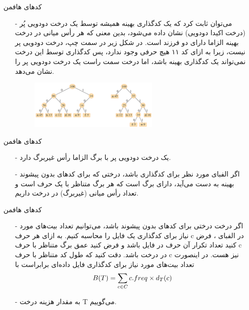 \begin{frame}{‌کدهای هافمن}
\begin{itemize}\itemr
\item[-]
می‌توان ثابت کرد که یک کدگذاری بهینه همیشه توسط یک درخت دودویی پُر
(درخت اکیدا دودویی)
نشان داده می‌شود،
بدین معنی که هر رأس میانی در درخت بهینه الزاما دارای دو فرزند است. در شکل زیر در سمت چپ، درخت دودویی پر نیست، زیرا به ازای کد ۱۱ هیچ حرفی وجود ندارد،
پس کدگذاری توسط این درخت نمی‌تواند یک کدگذاری بهینه باشد،
 اما درخت سمت راست یک درخت دودویی پر را نشان می‌دهد.
\begin{figure}
\includegraphics[width=0.6\textwidth]{figs/chap05/huffman-tree}
\end{figure}
\end{itemize}
\end{frame}


\begin{frame}{‌کدهای هافمن}
\begin{itemize}\itemr
\item[-]
یک درخت دودویی پر با 
 برگ الزاما 
رأس غیربرگ دارد.
\item[-]
اگر
الفبای مورد نظر برای کدگذاری باشد، درختی که برای کدهای بدون پیشوند بهینه به دست می‌آید، دارای
برگ است که هر برگ متناظر با یک حرف است و تعداد
رأس میانی (غیربرگ) در درخت داریم.
\end{itemize}
\end{frame}


\begin{frame}{‌کدهای هافمن}
\begin{itemize}\itemr
\item[-]
اگر درخت
درختی برای کدهای بدون پیشوند باشد، می‌توانیم تعداد بیت‌های مورد نیاز برای کدگذاری یک فایل را محاسبه کنیم. به ازای هر حرف c در الفبای
 ، فرض کنید
تعداد تکرار آن حرف در فایل باشد و فرض کنید
عمق برگ متناظر با حرف c در درخت باشد. دقت کنید که
طول کد متناظر با حرف c نیز هست. در اینصورت تعداد بیت‌های مورد نیاز برای کدگذاری فایل داده‌ای برابراست با
\begin{align*}
\mathnormal{B(T) = \sum_{c \in C} c.freq \times d_T(c)}
\end{align*}
\item[-]
به مقدار
هزینه
درخت T می‌گوییم.
\end{itemize}
\end{frame}


